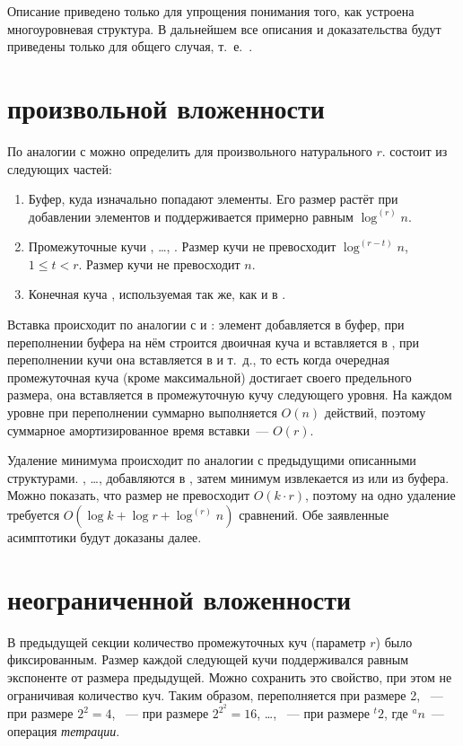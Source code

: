 Описание \CH[2] приведено только для упрощения понимания того, как
устроена многоуровневая структура. В дальнейшем все описания и доказательства
будут приведены только для общего случая, т.~е.~\CH[r].

\section{\CH произвольной вложенности}
По аналогии с \CH[2] можно определить \CH[r] для произвольного натурального $r$.  
\CH[r] состоит из следующих частей:

\begin{enumerate}
\item Буфер, куда изначально попадают элементы. Его размер растёт при добавлении
    элементов и поддерживается примерно равным $\log^{(r)} n$.
\item Промежуточные кучи \MH[1], \dots, \MH[r]. Размер кучи \MH[t] не превосходит
    $\log^{(r-t)} n$, $1 \leq t < r$. Размер кучи \MH[r] не превосходит $n$.
\item Конечная куча \HH, используемая так же, как и в \SCH.
\end{enumerate}

Вставка происходит по аналогии с \SCH и \CH[2]: элемент добавляется в буфер,
при переполнении буфера на нём строится двоичная куча и вставляется в \MH[1],
при переполнении кучи \MH[1] она вставляется в \MH[2] и т.~д., то есть
когда очередная промежуточная куча (кроме максимальной) достигает своего предельного
размера, она вставляется в промежуточную кучу следующего уровня.
На каждом уровне при переполнении суммарно выполняется $O(n)$ действий,
поэтому суммарное амортизированное время вставки~--- $O(r)$.

Удаление минимума происходит по аналогии с предыдущими описанными структурами.
\MH[1], \dots, \MH[r] добавляются в \HH, затем минимум извлекается из \HH
или из буфера. Можно показать, что размер \HH не превосходит
$O(k \cdot r)$, поэтому на одно удаление требуется $O(\log k + \log r + \log^{(r)} n)$
сравнений. Обе заявленные асимптотики будут доказаны далее.

\section{\CH неограниченной вложенности}

В предыдущей секции количество промежуточных куч (параметр $r$) было фиксированным.
Размер каждой следующей кучи поддерживался равным экспоненте от размера
предыдущей. Можно сохранить это свойство, при этом не ограничивая количество куч.
Таким образом, \MH[1] переполняется при размере 2, \MH[2]~--- при размере $2^2 = 4$,
\MH[3]~--- при размере $2^{2^2} = 16$, \dots, \MH[t]~--- при размере ${}^{t}2$,
где ${}^{a}n$~--- операция \emph{тетрации}.

